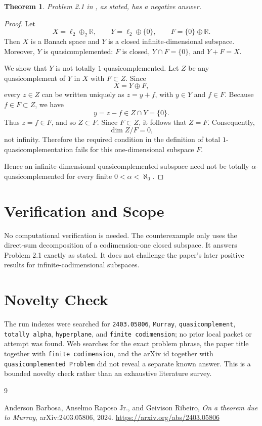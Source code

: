 \documentclass[11pt]{article}
\newtheorem{theorem}{Theorem}
\newcommand{\elltwo}{\ell_2}
\newcommand{\RR}{\mathbb R}
\begin{document}
\begin{theorem}
Problem 2.1 in \cite{BRR}, as stated, has a negative answer.
\end{theorem}

\begin{proof}
Let
\[
  X=\elltwo\oplus_2 \RR,\qquad
  Y=\elltwo\oplus\{0\},\qquad
  F=\{0\}\oplus \RR .
\]
Then \(X\) is a Banach space and \(Y\) is a closed infinite-dimensional
subspace. Moreover, \(Y\) is quasicomplemented: \(F\) is closed,
\(Y\cap F=\{0\}\), and \(Y+F=X\).

We show that \(Y\) is not totally \(1\)-quasicomplemented. Let \(Z\) be any
quasicomplement of \(Y\) in \(X\) with \(F\subset Z\). Since
\[
  X=Y\oplus F,
\]
every \(z\in Z\) can be written uniquely as \(z=y+f\), with
\(y\in Y\) and \(f\in F\). Because \(f\in F\subset Z\), we have
\[
  y=z-f\in Z\cap Y=\{0\}.
\]
Thus \(z=f\in F\), and so \(Z\subset F\). Since \(F\subset Z\), it follows
that \(Z=F\). Consequently,
\[
  \dim Z/F=0,
\]
not infinity. Therefore the required condition in the definition of total
\(1\)-quasicomplementation fails for this one-dimensional subspace \(F\).

Hence an infinite-dimensional quasicomplemented subspace need not be totally
\(\alpha\)-quasicomplemented for every finite \(0<\alpha<\aleph_0\).
\end{proof}

\section*{Verification and Scope}

No computational verification is needed. The counterexample only uses the
direct-sum decomposition of a codimension-one closed subspace. It answers
Problem 2.1 exactly as stated. It does not challenge the paper's later
positive results for infinite-codimensional subspaces.

\section*{Novelty Check}

The run indexes were searched for \texttt{2403.05806}, \texttt{Murray},
\texttt{quasicomplement}, \texttt{totally alpha}, \texttt{hyperplane}, and
\texttt{finite codimension}; no prior local packet or attempt was found. Web
searches for the exact problem phrase, the paper title together with
\texttt{finite codimension}, and the arXiv id together with
\texttt{quasicomplemented Problem} did not reveal a separate known answer.
This is a bounded novelty check rather than an exhaustive literature survey.

\begin{thebibliography}{9}

Anderson Barbosa, Anselmo Raposo Jr., and Geivison Ribeiro,
\emph{On a theorem due to Murray},
arXiv:2403.05806, 2024.
\url{https://arxiv.org/abs/2403.05806}

\end{thebibliography}
\end{document}

